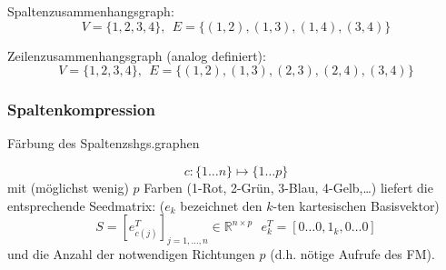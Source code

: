Spaltenzusammenhangsgraph:
$$V=\{1,2,3,4\},\ \ E=\{(1,2),(1,3),(1,4),(3,4)\}$$

Zeilenzusammenhangsgraph (analog definiert):
$$V=\{1,2,3,4\},\ \ E=\{(1,2),(1,3),(2,3),(2,4),(3,4)\}$$

\noindent
\subsubsection{Spaltenkompression}
Färbung des Spaltenzshgs.graphen
\label{subsubsec:coloring_col_intersection_graph}

$$c:\{1\dots n\}\mapsto \{1\dots p\}$$
mit (möglichst wenig) $p$ Farben (1-Rot, 2-Grün, 3-Blau, 4-Gelb,\dots)
liefert die entsprechende Seedmatrix: ($e_k$ bezeichnet den $k$-ten kartesischen Basisvektor)
$$S = [e^T_{c(j)}]_{j=1,\dots,n}\in \mathbb{R}^{n\times p}\ \ \ e_k^T = [0 \dots 0,1_k, 0 \dots 0]$$
und die Anzahl der notwendigen Richtungen $p$ (d.h. nötige Aufrufe des FM).\\

